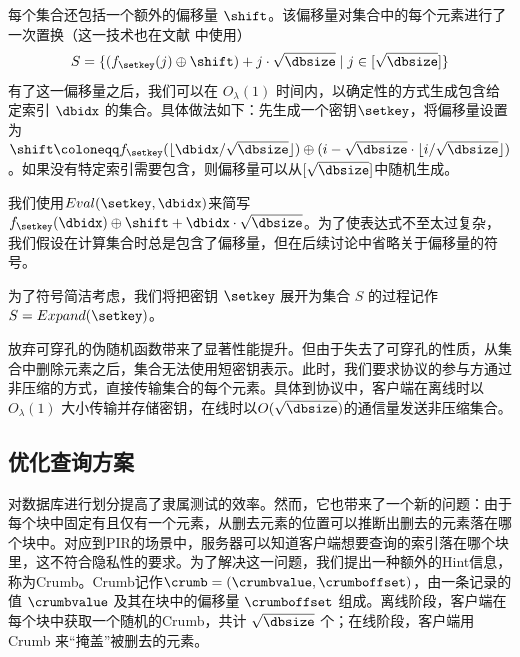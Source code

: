 每个集合还包括一个额外的偏移量 $\shift$。该偏移量对集合中的每个元素进行了一次置换（这一技术也在文献 \cite{EC:CorKog20, C:LazPap23} 中使用）
$$S = \{(f_{\setkey}(j)\oplus \shift) + j \cdot \sqrt{\dbsize} \mid j \in [\sqrt{\dbsize}]\}$$
有了这一偏移量之后，我们可以在 $O_\lambda(1)$ 时间内，以确定性的方式生成包含给定索引 $\dbidx$ 的集合。具体做法如下：先生成一个密钥$\setkey$，将偏移量设置为$\shift \coloneqq f_{\setkey}(\lfloor \dbidx/\sqrt{\dbsize}\rfloor) \oplus (i - \sqrt{\dbsize}\cdot\lfloor i/\sqrt{\dbsize}\rfloor)$。如果没有特定索引需要包含，则偏移量可以从$[\sqrt{\dbsize}]$中随机生成。

我们使用$Eval(\setkey,\dbidx)$来简写$f_{\setkey}(\dbidx)\oplus \shift + \dbidx\cdot\sqrt{\dbsize}$。为了使表达式不至太过复杂，我们假设在计算集合时总是包含了偏移量，但在后续讨论中省略关于偏移量的符号。

为了符号简洁考虑，我们将把密钥 $\setkey$ 展开为集合 $S$ 的过程记作 $S = Expand(\setkey)$。

放弃可穿孔的伪随机函数带来了显著性能提升。但由于失去了可穿孔的性质，从集合中删除元素之后，集合无法使用短密钥表示。此时，我们要求协议的参与方通过非压缩的方式，直接传输集合的每个元素。具体到协议中，客户端在离线时以 $O_\lambda(1)$ 大小传输并存储密钥，在线时以$O(\sqrt{\dbsize})$的通信量发送非压缩集合。

\subsection{优化查询方案}
\label{sec:problem-of-dividing}
对数据库进行划分提高了隶属测试的效率。然而，它也带来了一个新的问题：由于每个块中固定有且仅有一个元素，从删去元素的位置可以推断出删去的元素落在哪个块中。对应到PIR的场景中，服务器可以知道客户端想要查询的索引落在哪个块里，这不符合隐私性的要求。为了解决这一问题，我们提出一种额外的Hint信息，称为Crumb。Crumb记作$\crumb=(\crumbvalue, \crumboffset)$，由一条记录的值 $\crumbvalue$ 及其在块中的偏移量 $\crumboffset$ 组成。离线阶段，客户端在每个块中获取一个随机的Crumb，共计 $\sqrt{\dbsize}$ 个；在线阶段，客户端用 Crumb 来“掩盖”被删去的元素。

